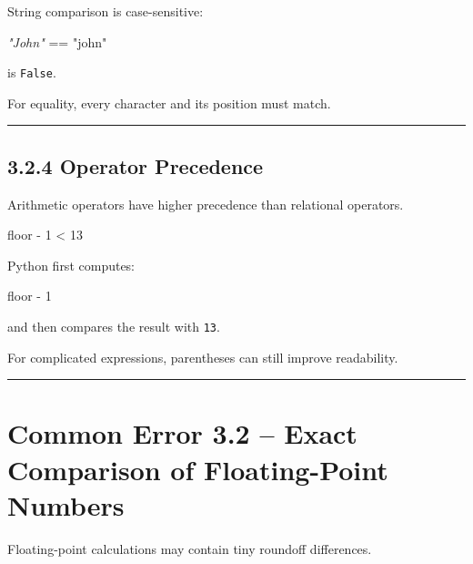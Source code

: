 \documentclass[
  11pt,
  a4paper,
]{article}
\newenvironment{Shaded}{}{}
\newcommand{\CommentTok}[1]{\textcolor[rgb]{0.38,0.63,0.69}{\textit{#1}}}
\newcommand{\DecValTok}[1]{\textcolor[rgb]{0.25,0.63,0.44}{#1}}
\newcommand{\NormalTok}[1]{#1}
\newcommand{\OperatorTok}[1]{\textcolor[rgb]{0.40,0.40,0.40}{#1}}
\newcommand{\StringTok}[1]{\textcolor[rgb]{0.25,0.44,0.63}{#1}}
\begin{document}
String comparison is case-sensitive:

\begin{Shaded}
\begin{Highlighting}[]
\CommentTok{"John"} \OperatorTok{==} \StringTok{"john"}
\end{Highlighting}
\end{Shaded}

is \texttt{False}.

For equality, every character and its position must match.

\begin{center}\rule{0.5\linewidth}{0.5pt}\end{center}

\subsection{3.2.4 Operator Precedence}\label{operator-precedence}

Arithmetic operators have higher precedence than relational operators.

\begin{Shaded}
\begin{Highlighting}[]
\NormalTok{floor }\OperatorTok{{-}} \DecValTok{1} \OperatorTok{\textless{}} \DecValTok{13}
\end{Highlighting}
\end{Shaded}

Python first computes:

\begin{Shaded}
\begin{Highlighting}[]
\NormalTok{floor {-} 1}
\end{Highlighting}
\end{Shaded}

and then compares the result with \texttt{13}.

For complicated expressions, parentheses can still improve readability.

\begin{center}\rule{0.5\linewidth}{0.5pt}\end{center}

\section{Common Error 3.2 -- Exact Comparison of Floating-Point
Numbers}\label{common-error-3.2-exact-comparison-of-floating-point-numbers}

Floating-point calculations may contain tiny roundoff differences.
\end{document}

